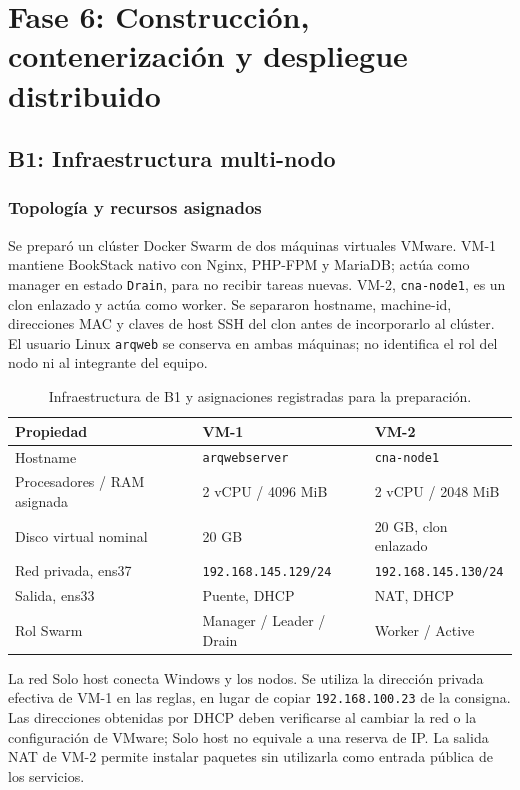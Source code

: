 \clearpage
\section{Fase 6: Construcción, contenerización y despliegue distribuido}
\label{sec:fase6}
\subsection{B1: Infraestructura multi-nodo}
\label{sec:fase6-b1}

\subsubsection{Topología y recursos asignados}
Se preparó un clúster Docker Swarm de dos máquinas virtuales VMware.
VM-1 mantiene BookStack nativo con Nginx, PHP-FPM y MariaDB; actúa como
manager en estado \texttt{Drain}, para no recibir tareas nuevas. VM-2,
\texttt{cna-node1}, es un clon enlazado y actúa como worker. Se separaron
hostname, machine-id, direcciones MAC y claves de host SSH del clon antes
de incorporarlo al clúster. El usuario Linux \texttt{arqweb} se conserva en
ambas máquinas; no identifica el rol del nodo ni al integrante del equipo.

\begin{table}[H]
\centering\small
\begin{tabularx}{\textwidth}{>{\raggedright\arraybackslash}p{3.1cm}XX}
\toprule
\textbf{Propiedad} & \textbf{VM-1} & \textbf{VM-2} \\
\midrule
Hostname & \texttt{arqwebserver} & \texttt{cna-node1} \\
Procesadores / RAM asignada & 2 vCPU / 4096 MiB & 2 vCPU / 2048 MiB \\
Disco virtual nominal & 20 GB & 20 GB, clon enlazado \\
Red privada, ens37 & \texttt{192.168.145.129/24} & \texttt{192.168.145.130/24} \\
Salida, ens33 & Puente, DHCP & NAT, DHCP \\
Rol Swarm & Manager / Leader / Drain & Worker / Active \\
\bottomrule
\end{tabularx}
\caption{Infraestructura de B1 y asignaciones registradas para la preparación.}
\label{tab:b1-recursos}
\end{table}

La red Solo host conecta Windows y los nodos. Se utiliza la dirección
privada efectiva de VM-1 en las reglas, en lugar de copiar
\texttt{192.168.100.23} de la consigna. Las direcciones obtenidas por DHCP
deben verificarse al cambiar la red o la configuración de VMware; Solo host
no equivale a una reserva de IP. La salida NAT de VM-2 permite instalar
paquetes sin utilizarla como entrada pública de los servicios.

